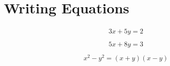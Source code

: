 \documentclass{book}
\begin{document}
	\chapter{Writing Equations}
	\paragraph{}
	\begin{equation}
		3x+5y=2
	\end{equation}
	
	\begin{equation}
		5x+8y=3
	\end{equation}
	
	\begin{equation}
		x^{2}-y^{2}=(x+y)(x-y)
	\end{equation}
\end{document}
